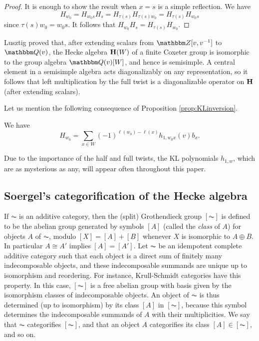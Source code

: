 \begin{proof}
It is enough to show the result when $x = s$ is a simple reflection. We have
\[
H_{w_0} = H_{w_0s} H_s  = H_{\tau(s)}H_{\tau(s)w_0}  = H_{\tau(s)} H_{w_0 s}
\]
since $\tau(s)w_0 = w_0s$.  It follows that  $H_{w_0} H_s = H_{\tau(s)} H_{w_0}$.
\end{proof}


Lusztig proved \cite{Lusz81} that, after extending scalars from $\Z[v,v\inv]$ to $\Q(v)$, the Hecke algebra ${\mathbf H}(W)$ of a finite Coxeter group is isomorphic to the group algebra $\Q(v)[W]$, and hence is semisimple. A central element in a semisimple algebra acts diagonalizably on any representation, so it follows that left multiplication by the full twist is a diagonalizable operator on ${\mathbf H}$ (after extending scalars).

Let us mention the following consequence of Proposition \ref{prop:KLinversion}.
 
\begin{cor} \label{cor:KLhalftwist}
We have 
\begin{equation} \label{eq:KLhalftwist} H_{w_0} = \sum_{x \in W} (-1)^{\ell(w_0) - \ell(x)} h_{1, w_0 x}(v) b_x.\end{equation}
\end{cor}

Due to the importance of the half and full twists, the KL polynomials $h_{1,w}$, which are as mysterious as any, will appear often throughout this paper.


\subsection{Soergel's categorification of the Hecke algebra}
\label{subsec:SoergelCat}


If $\AC$ is an additive category, then the (split) Grothendieck group $[\AC]$ is defined to be the abelian group generated by symbols $[A]$ (called the \emph{class} of $A$) for objects $A$ of $\AC$, modulo $[X]=[A]+[B]$ whenever $X$ is isomorphic to $A \oplus B$. In particular $A\cong A'$ implies $[A]=[A']$.  Let $\AC$ be an idempotent complete additive category such that each object is a direct sum of finitely many indecomposable objects, and these indecomposable summands are unique up to isomorphism and reordering.  For instance, Krull-Schmidt categories have this property.  In this case, $[\AC]$ is a free abelian group with basis given by the isomorphism
classes of indecomposable objects. An object of $\AC$ is thus determined (up to isomorphism) by its class $[A]$ in $[\AC]$, because this symbol determines the indecomposable summands of $A$ with their multiplicities. We say that $\AC$ categorifies $[\AC]$, and that an object $A$ categorifies its class $[A]\in [\AC]$, and so on.

